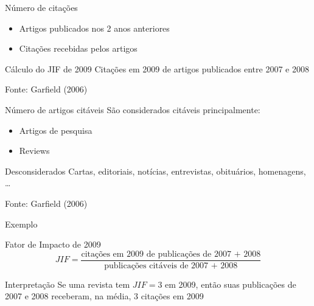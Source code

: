 \documentclass{beamer}
\begin{document}
\begin{frame}{Número de citações}
  \begin{itemize}
    \footnotesize
  \item Artigos publicados nos 2 anos anteriores
    \bigskip
  \item Citações recebidas pelos artigos
  \end{itemize}
  \bigskip
  \bigskip
  \begin{exampleblock}{Cálculo do JIF de 2009}
    \footnotesize
    Citações em 2009 de artigos publicados entre 2007 e 2008
  \end{exampleblock}

  \vfill
  \footnotesize
  \hfill Fonte: Garfield (2006)
\end{frame}

\begin{frame}{Número de artigos citáveis}
  \small
  São considerados citáveis principalmente:
  \bigskip
  \begin{itemize}
    \footnotesize
  \item Artigos de pesquisa
    \bigskip
  \item Reviews
  \end{itemize}
  \bigskip
  \begin{block}{Desconsiderados}
    \scriptsize
    Cartas, editoriais, notícias, entrevistas, obituários, homenagens, \ldots
  \end{block}

  \vfill
  \footnotesize
  \hfill Fonte: Garfield (2006)
\end{frame}

\begin{frame}{Exemplo}
  \begin{exampleblock}{Fator de Impacto de 2009}
    \small
    \begin{displaymath}
      JIF = \frac{\text{citações em 2009 de publicações de 2007 + 2008}}{\text{publicações citáveis de 2007 + 2008}}
    \end{displaymath}
  \end{exampleblock}
  \bigskip
  \bigskip
  \begin{block}{Interpretação}
    \footnotesize
    Se uma revista tem $JIF=3$ em 2009, então suas publicações de 2007 e 2008 receberam, na média, 3 citações em 2009
  \end{block}
\end{frame}
\end{document}
